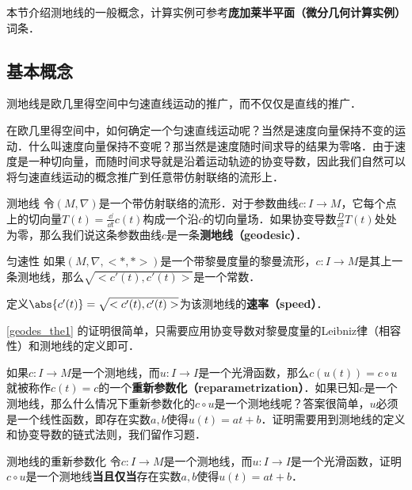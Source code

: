

本节介绍测地线的一般概念，计算实例可参考\textbf{庞加莱半平面（微分几何计算实例）}词条．

\subsection{基本概念}

测地线是欧几里得空间中匀速直线运动的推广，而不仅仅是直线的推广．

在欧几里得空间中，如何确定一个匀速直线运动呢？当然是速度向量保持不变的运动．什么叫速度向量保持不变呢？那当然是速度随时间求导的结果为零咯．由于速度是一种切向量，而随时间求导就是沿着运动轨迹的协变导数，因此我们自然可以将匀速直线运动的概念推广到任意带仿射联络的流形上．

\begin{definition}{测地线}
令$(M, \nabla)$是一个带仿射联络的流形．对于参数曲线$c:I\to M$，它每个点上的切向量$T(t)=\frac{\dd}{\dd t}c(t)$构成一个沿$c$的切向量场．如果协变导数$\frac{D}{\dd t}T(t)$处处为零，那么我们说这条参数曲线$c$是一条\textbf{测地线（geodesic）}．
\end{definition}

\begin{theorem}{匀速性}\label{geodes_the1}
如果$(M, \nabla, <*, *>)$是一个带黎曼度量的黎曼流形，$c:I\to M$是其上一条测地线，那么$\sqrt{<c'(t), c'(t)>}$是一个常数．

定义$\abs{c'(t)}=\sqrt{<c'(t), c'(t)>}$为该测地线的\textbf{速率（speed）}．
\end{theorem}

\autoref{geodes_the1} 的证明很简单，只需要应用协变导数对黎曼度量的Leibniz律（相容性）和测地线的定义即可．



如果$c:I\to M$是一个测地线，而$u:I\to I$是一个光滑函数，那么$c(u(t))=c\circ u$就被称作$c(t)=c$的一个\textbf{重新参数化（reparametrization）}．如果已知$c$是一个测地线，那么什么情况下重新参数化的$c\circ u$是一个测地线呢？答案很简单，$u$必须是一个线性函数，即存在实数$a, b$使得$u(t)=at+b$．证明需要用到测地线的定义和协变导数的链式法则，我们留作习题．

\begin{exercise}{测地线的重新参数化}
令$c:I\to M$是一个测地线，而$u:I\to I$是一个光滑函数，证明$c\circ u$是一个测地线\textbf{当且仅当}存在实数$a, b$使得$u(t)=at+b$．
\end{exercise}

